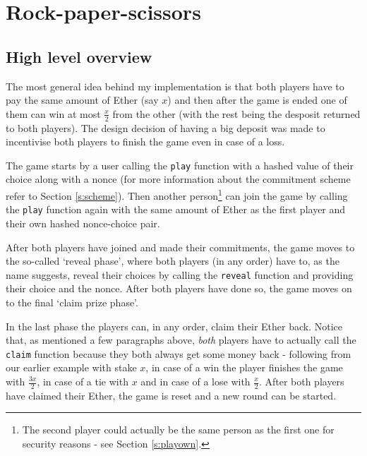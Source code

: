 \documentclass{article}
\begin{document}
    \section{Rock-paper-scissors}

    \subsection{High level overview} \label{s:overview}
    The most general idea behind my implementation is that
    both players have to pay the same amount of Ether (say
    \(x\)) and then after the game is ended one of them can
    win at most \(\frac{x}{2}\) from the other (with the
    rest being the desposit returned to both players). The
    design decision of having a big deposit was made to
    incentivise both players to finish the game even in case
    of a loss.
    \newline

    \noindent The game starts by a user calling the
    \verb|play| function with a hashed value of their choice
    along with a nonce (for more information about the
    commitment scheme refer to Section \ref{s:scheme}). Then
    another person\footnote{The second player could actually
    be the same person as the first one for security reasons
    - see Section \ref{s:playown}.} can join the game by
    calling the \verb|play| function again with the same
    amount of Ether as the first player and their own hashed
    nonce-choice pair.
    \newline

    \noindent After both players have joined and made their
    commitments, the game moves to the so-called `reveal
    phase', where both players (in any order) have to, as
    the name suggests, reveal their choices by calling the
    \verb|reveal| function and providing their choice and
    the nonce. After both players have done so, the game
    moves on to the final `claim prize phase'.
    \newline

    \noindent In the last phase the players can, in any
    order, claim their Ether back. Notice that, as mentioned
    a few paragraphs above, {\itshape both} players have to
    actually call the \verb|claim| function because they
    both always get some money back - following from our
    earlier example with stake \(x\), in case of a win the
    player finishes the game with \(\frac{3x}{2}\), in case
    of a tie with \(x\) and in case of a lose with
    \(\frac{x}{2}\). After both players have claimed their
    Ether, the game is reset and a new round can be started.
\end{document}

